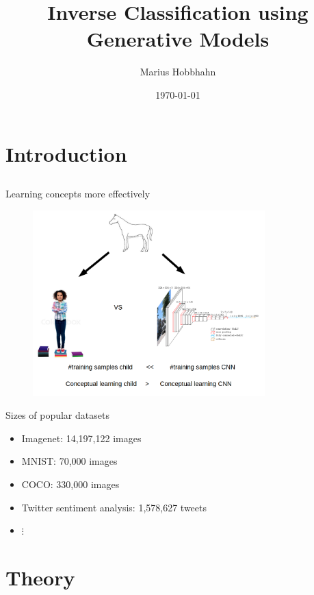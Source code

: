 \documentclass[compress]{beamer}
\title[BA Hobbhahn 2018]{Inverse Classification using Generative Models}
\author{Marius Hobbhahn}
\date{\today}
\begin{document}
	
	\begin{frame}
		\titlepage
	\end{frame}
	\section{Introduction}
	\subsection{ } %
	\begin{frame}{Learning concepts more effectively}
		\begin{figure}
			\centering
			\includegraphics[width=0.8\textwidth]{images/intro_BA.png}
		\end{figure}
	\end{frame}
	\begin{frame}{Sizes of popular datasets}
		\begin{itemize}
			\item Imagenet: 14,197,122 images
			\item MNIST: 70,000 images
			\item COCO: 330,000 images
			\item Twitter sentiment analysis: 1,578,627 tweets
			\item $\vdots$
		\end{itemize}
	\end{frame}
	\section{Theory}
\end{document}
